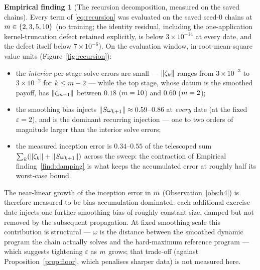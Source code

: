\documentclass[11pt]{article}
\newcommand{\heatSemigroup}{S}       %
\newcommand{\solveError}{\zeta}      %
\newcommand{\smoothMaxBias}{\omega}  %
\theoremstyle{plain}
\theoremstyle{definition}
\newtheorem{finding}[theorem]{Empirical finding}
\theoremstyle{remark}
\begin{document}
\begin{finding}[The recursion decomposition, measured on the saved chains]\label{find:recursion}
Every term of \eqref{eq:recursion} was evaluated on the saved seed-0 chains at
$m\in\{2,3,5,10\}$ (no training; the identity residual, including
the one-application kernel-truncation defect retained explicitly, is below
$3\times10^{-14}$ at every date, and the defect itself below $7\times10^{-6}$).
On the evaluation window, in root-mean-square value units
(Figure~\ref{fig:recursion}):
\begin{itemize}
  \item the \emph{interior} per-stage solve errors are small ---
    $\norm{\solveError_k}$ ranges from $3\times10^{-3}$ to $3\times10^{-2}$ for
    $k\le m-2$ --- while the top stage, whose datum is the
    smoothed payoff, has $\norm{\solveError_{\numExerciseDates-1}}$ between
    $0.18$ ($m=10$) and $0.60$ ($m=2$);
  \item the smoothing bias injects $\norm{\heatSemigroup\smoothMaxBias_{k+1}}
    \approx0.59$--$0.86$ at \emph{every} date (at the fixed $\varepsilon=2$), and
    is the dominant recurring injection --- one to two orders of magnitude larger
    than the interior solve errors;
  \item the measured inception error is $0.34$--$0.55$ of the telescoped sum
    $\sum_k(\norm{\solveError_k}+\norm{\heatSemigroup\smoothMaxBias_{k+1}})$
    across the sweep: the contraction of Empirical finding~\ref{find:damping} is
    what keeps the accumulated error at roughly half its worst-case bound.
\end{itemize}
The near-linear growth of the inception error in $m$
(Observation~\ref{obs:h4}) is therefore measured to be bias-accumulation
dominated: each additional exercise date injects one further smoothing bias of
roughly constant size, damped but not removed by the subsequent propagation.
At fixed smoothing scale this contribution is structural ---
$\smoothMaxBias$ is the distance between the smoothed dynamic program the chain
actually solves and the hard-maximum reference program --- which suggests
tightening $\varepsilon$ as $m$ grows; that trade-off (against
Proposition~\ref{prop:floor}, which penalises sharper data) is not measured here.
\end{finding}
\end{document}
